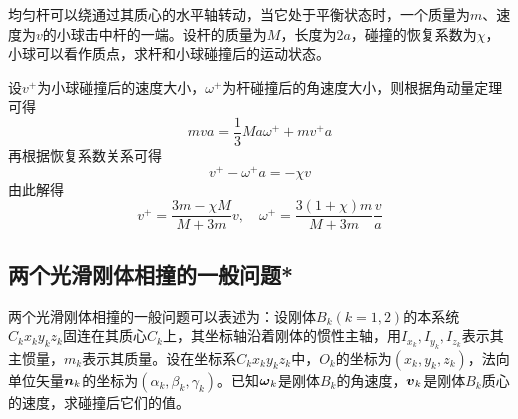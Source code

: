 \begin{example}
均匀杆可以绕通过其质心的水平轴转动，当它处于平衡状态时，一个质量为$m$、速度为$v$的小球击中杆的一端。设杆的质量为$M$，长度为$2a$，碰撞的恢复系数为$\chi$，小球可以看作质点，求杆和小球碰撞后的运动状态。
\end{example}
\begin{solution}
设$v^+$为小球碰撞后的速度大小，$\omega^+$为杆碰撞后的角速度大小，则根据角动量定理可得
\begin{equation*}
	mva = \dfrac13Ma\omega^++mv^+a
\end{equation*}
再根据恢复系数关系可得
\begin{equation*}
	v^+-\omega^+a=-\chi v
\end{equation*}
由此解得
\begin{equation*}
	v^+ = \frac{3m-\chi M}{M+3m}v,\quad \omega^+ = \frac{3(1+\chi)m}{M+3m}\frac{v}{a}
\end{equation*}
\end{solution}

\subsection{两个光滑刚体相撞的一般问题*}

两个光滑刚体相撞的一般问题可以表述为：设刚体$B_k(k=1,2)$的本系统$C_kx_ky_kz_k$固连在其质心$C_k$上，其坐标轴沿着刚体的惯性主轴，用$I_{x_k},I_{y_k},I_{z_k}$表示其主惯量，$m_k$表示其质量。设在坐标系$C_kx_ky_kz_k$中，$O_k$的坐标为$(x_k,y_k,z_k)$，法向单位矢量$\boldsymbol{n}_k$的坐标为$(\alpha_k,\beta_k,\gamma_k)$。已知$\boldsymbol{\omega}_k$是刚体$B_k$的角速度，$\boldsymbol{v}_k$是刚体$B_k$质心的速度，求碰撞后它们的值。

